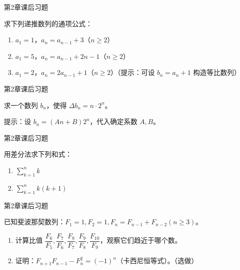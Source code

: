 \documentclass[aspectratio=169,10pt,fontset=fandol]{ctexbeamer}
\begin{document}
\begin{frame}[t,fragile]{第2章课后习题}
\normalsize
{\normalsize
求下列递推数列的通项公式：

\begin{enumerate}

\item \(a_1 = 1\)，\(a_n = a_{n-1} + 3\)（\(n \geq 2\)）

\item \(a_1 = 5\)，\(a_n = a_{n-1} + 2n - 1\)（\(n \geq 2\)）

\item \(a_1 = 2\)，\(a_n = 2a_{n-1} + 1\)（\(n \geq 2\)）\quad（提示：可设 \(b_n = a_n + 1\) 构造等比数列）

\end{enumerate}


}
\end{frame}
\begin{frame}[t,fragile]{第2章课后习题}
\normalsize
{\normalsize
求一个数列 \(b_n\)，使得 \(\Delta b_n = n \cdot 2^n\)。

提示：设 \(b_n = (An + B)2^n\)，代入确定系数 \(A, B\)。


}
\end{frame}
\begin{frame}[t,fragile]{第2章课后习题}
\normalsize
{\normalsize
用差分法求下列和式：

\begin{enumerate}

\item \(\sum_{k=1}^{n} k\)

\item \(\sum_{k=1}^{n} k(k+1)\)

\end{enumerate}


}
\end{frame}
\begin{frame}[t,fragile]{第2章课后习题}
\normalsize
{\normalsize
已知斐波那契数列：\(F_1 = 1, F_2 = 1, F_n = F_{n-1} + F_{n-2} (n \geq 3)\)。

\begin{enumerate}

\item 计算比值 \(\dfrac{F_6}{F_5}, \dfrac{F_7}{F_6}, \dfrac{F_8}{F_7}, \dfrac{F_9}{F_8}, \dfrac{F_{10}}{F_9}\)，观察它们趋近于哪个数。

\item 证明：\(F_{n+1}F_{n-1} - F_n^2 = (-1)^n\)（卡西尼恒等式）。（选做）

\end{enumerate}


}
\end{frame}
\end{document}

